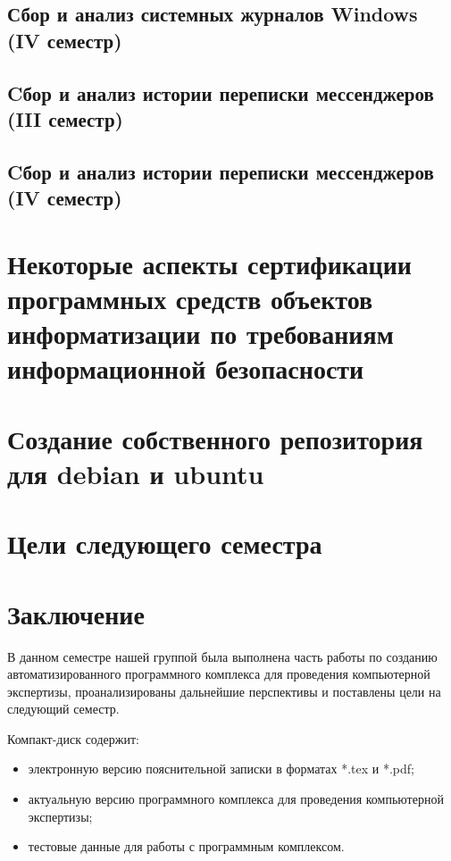 \documentclass[russian,utf8,14pt,simple]{eskdtext}
\begin{document}
\subsection{Сбор и анализ системных журналов Windows (IV семестр)} 

\newpage
\subsection{Cбор и анализ истории переписки мессенджеров (III семестр)} %

\subsection{Cбор и анализ истории переписки мессенджеров (IV семестр)} 


\section{Некоторые аспекты сертификации программных средств объектов\\ информатизации по требованиям информационной безопасности} %
\setcounter{figure}{0}


\section{Создание собственного репозитория для debian и ubuntu}
\setcounter{figure}{0}


\newpage
\section{Цели следующего семестра}


\section{Заключение}
В данном семестре нашей группой была выполнена часть работы по созданию автоматизированного программного комплекса для проведения компьютерной экспертизы, проанализированы дальнейшие перспективы и поставлены цели на следующий семестр.

\newpage
\renewcommand{\refname}{Список использованных источников}


Компакт-диск содержит: 
\begin{itemize}
\item электронную версию пояснительной записки в форматах *.tex и *.pdf;
\item актуальную версию программного комплекса для проведения компьютерной экспертизы;
\item тестовые данные для работы с программным комплексом.
\end{itemize}
\end{document}
